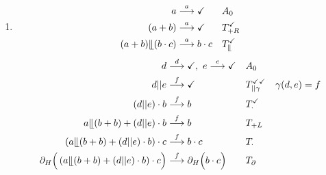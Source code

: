 \documentclass[a4paper]{scrartcl}
\newcommand{\too}{\longrightarrow}
\begin{document}
\begin{enumerate}
\begin{figure}[h]
\begin{subfigure}{0.45\textwidth}
                \caption{Prozessgraph von $t_7$}
            \end{subfigure}
            \label{fig:13-4-process}
        \end{figure}
        \begin{equation}
            \begin{split}
                \checkmark \ &\mathcal{B}\  \checkmark \\
                c \ &\mathcal{B}\  \partial_H \left( c \right) \\
                b \cdot c \ &\mathcal{B}\  \partial_H \left( b \cdot c \right) \\
                b \cdot c \ &\mathcal{B}\  \partial_H \left( (b + b) \cdot c \right) \\
            \end{split}
        \end{equation}
        Die Prozesse $t_6$ und $t_7$ sind nicht bisimilar.
        $t_6$ akzeptiert die Aktionsfolgen $abc$ und $bbc$ während $t_7$ $abc$
        und $fbc$ akzeptiert.

    \item
        \begin{align}
                a &\stackrel{a}{\too} \checkmark & &A_0 \\
                (a + b) &\stackrel{a}{\too} \checkmark & &T_{+R}^\checkmark \\
                (a + b) \llfloor (b \cdot c) &\stackrel{a}{\too} b \cdot c & &T_\llfloor^\checkmark \\
        \end{align}
        \begin{align}
                d &\stackrel{d}{\too} \checkmark ,\ e \stackrel{e}{\too} \checkmark & &A_0 \\
                d||e &\stackrel{f}{\too} \checkmark & &T_{||\gamma}^{\checkmark\checkmark} \quad \gamma(d,e) = f \\
                (d||e) \cdot b &\stackrel{f}{\too} b & &T_\cdot^\checkmark \\
                a \llfloor (b + b) + (d||e) \cdot b &\stackrel{f}{\too} b & &T_{+L} \\
                \left( a \llfloor (b + b) + (d||e) \cdot b \right) \cdot c &\stackrel{f}{\too} b \cdot c & &T_\cdot \\
                \partial_H \Big( \left( a \llfloor (b + b) + (d||e) \cdot b \right) \cdot c \Big) &\stackrel{f}{\too} \partial_H \Big( b \cdot c \Big) & &T_\partial
        \end{align}


\end{enumerate}
\end{document}
